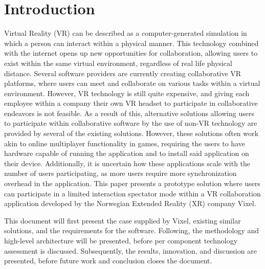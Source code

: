 \section{Introduction}
Virtual Reality (VR) can be described as a computer-generated simulation in which a person can interact within a physical manner\cite{vr_definition}. This technology combined with the internet opens up new opportunities for collaboration, allowing users to exist within the same virtual environment, regardless of real life physical distance. Several software providers are currently creating collaborative VR platforms, where users can meet and collaborate on various tasks within a virtual environment. However, VR technology is still quite expensive, and giving each employee within a company their own VR headset to participate in collaborative endeavors is not feasible. As a result of this, alternative solutions allowing users to participate within collaborative software by the use of non-VR technology are provided by several of the existing solutions\cite{rumii_vr, insite_vr}. However, these solutions often work akin to online multiplayer functionality in games, requiring the users to have hardware capable of running the application and to install said application on their device. Additionally, it is uncertain how these applications scale with the number of users participating, as more users require more synchronization overhead in the application. This paper presents a prototype solution where users can participate in a limited interaction spectator mode within a VR collaboration application developed by the Norwegian Extended Reality (XR) company Vixel.

This document will first present the case supplied by Vixel, existing similar solutions, and the requirements for the software. Following, the methodology and high-level architecture will be presented, before per component technology assessment is discussed. Subsequently, the results, innovation, and discussion are presented, before future work and conclusion closes the document. 